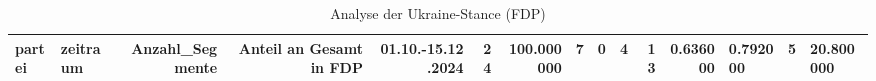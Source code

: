 \begin{table}
\caption{Analyse der Ukraine-Stance (FDP)}
\label{tab:meine_tabelle}
\begin{tabular}{llrrrrrrrrrr}
\toprule
partei & zeitraum & Anzahl_Segmente & Anteil an Gesamt in %
\midrule
FDP & 01.10.-15.12.2024 & 24 & 100.000000 & 7 & 0 & 4 & 13 & 0.636000 & 0.792000 & 5 & 20.800000 \\
\bottomrule
\end{tabular}
\end{table}
